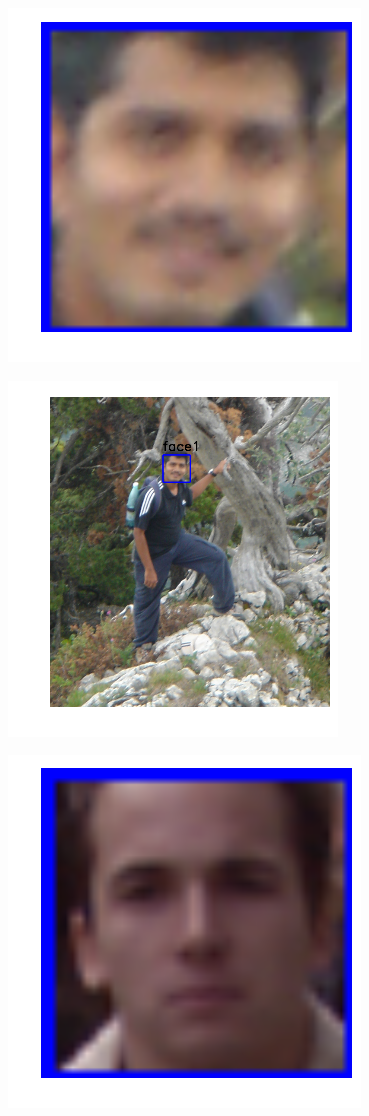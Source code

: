 \includegraphics{facedetection_files/facedetection_59_0.png}

\includegraphics{facedetection_files/facedetection_59_1.png}

\includegraphics{facedetection_files/facedetection_59_2.png}


